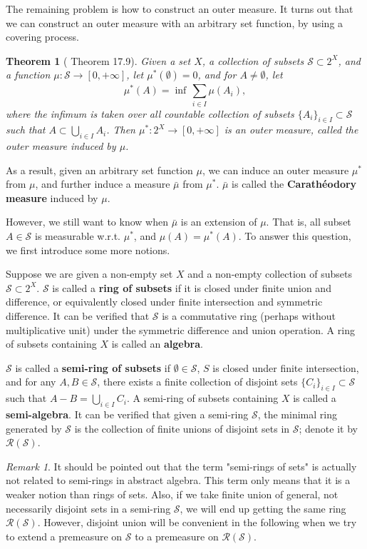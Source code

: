 \documentclass[openany]{book}
\newtheorem{theorem}{Theorem}[chapter]
\theoremstyle{definition}
\theoremstyle{remark}
\newtheorem*{remark}{Remark}
\begin{document}
The remaining problem is how to construct an outer measure. It turns out that we can construct an outer measure with an arbitrary set function, by using a covering process.
\begin{theorem}[\cite{RF88} Theorem 17.9]
    Given a set $X$, a collection of subsets $\mathcal{S}\subset2^X$, and a function $\mu:\mathcal{S}\to[0,+\infty]$, let $\mu^*(\emptyset)=0$, and for $A\ne\emptyset$, let
    \begin{equation*}
        \mu^*(A)=\inf\,\sum_{i\in I}^{}\mu(A_i),
    \end{equation*}
    where the infimum is taken over all countable collection of subsets $\{A_i\}_{i\in I}\subset \mathcal{S}$ such that $A\subset\bigcup_{i\in I}A_i$. Then $\mu^*:2^X\to[0,+\infty]$ is an outer measure, called the outer measure induced by $\mu$.
\end{theorem}
As a result, given an arbitrary set function $\mu$, we can induce an outer measure $\mu^*$ from $\mu$, and further induce a measure $\bar{\mu}$ from $\mu^*$. $\bar{\mu}$ is called the \textbf{Carath\'{e}odory measure} induced by $\mu$.

However, we still want to know when $\bar{\mu}$ is an extension of $\mu$. That is, all subset $A\in\mathcal{S}$ is measurable w.r.t. $\mu^*$, and $\mu(A)=\mu^*(A)$. To answer this question, we first introduce some more notions.

Suppose we are given a non-empty set $X$ and a non-empty collection of subsets $\mathcal{S}\subset2^X$. $\mathcal{S}$ is called a \textbf{ring of subsets} if it is closed under finite union and difference, or equivalently closed under finite intersection and symmetric difference. It can be verified that $\mathcal{S}$ is a commutative ring (perhaps without multiplicative unit) under the symmetric difference and union operation. A ring of subsets containing $X$ is called an \textbf{algebra}.

$\mathcal{S}$ is called a \textbf{semi-ring of subsets} if $\emptyset\in \mathcal{S}$, $S$ is closed under finite intersection, and for any $A,B\in \mathcal{S}$, there exists a finite collection of disjoint sets $\{C_i\}_{i\in I}\subset \mathcal{S}$ such that $A-B=\bigcup_{i\in I}C_i$. A semi-ring of subsets containing $X$ is called a \textbf{semi-algebra}. It can be verified that given a semi-ring $\mathcal{S}$, the minimal ring generated by $\mathcal{S}$ is the collection of finite unions of disjoint sets in $\mathcal{S}$; denote it by $\mathcal{R}(\mathcal{S})$.
\begin{remark}
    It should be pointed out that the term "semi-rings of sets" is actually not related to semi-rings in abstract algebra. This term only means that it is a weaker notion than rings of sets. Also, if we take finite union of general, not necessarily disjoint sets in a semi-ring $\mathcal{S}$, we will end up getting the same ring $\mathcal{R}(\mathcal{S})$. However, disjoint union will be convenient in the following when we try to extend a premeasure on $\mathcal{S}$ to a premeasure on $\mathcal{R}(\mathcal{S})$.
\end{remark}
\end{document}
